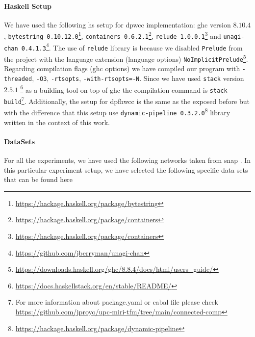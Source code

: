 \paragraph{Haskell Setup}
We have used the following \acrshort{hs} setup for \acrshort{dpwcc} implementation: \acrshort{ghc} version $8.10.4$, \texttt{bytestring 0.10.12.0}\footnote{\url{https://hackage.haskell.org/package/bytestring}}, \texttt{containers 0.6.2.1}\footnote{\url{https://hackage.haskell.org/package/containers}}, \texttt{relude 1.0.0.1}\footnote{\url{https://hackage.haskell.org/package/containers}} and \texttt{unagi-chan 0.4.1.3}\footnote{\url{https://github.com/jberryman/unagi-chan}}. 
The use of \texttt{relude} library is because we disabled \texttt{Prelude} from the project with the language extension (language options) \texttt{NoImplicitPrelude}\footnote{\url{https://downloads.haskell.org/ghc/8.8.4/docs/html/users_guide/}}. 
Regarding compilation flags (\acrshort{ghc} options) we have compiled our program with \texttt{-threaded}, \texttt{-O3}, \texttt{-rtsopts}, \texttt{-with-rtsopts=-N}. 
Since we have used \texttt{stack} version $2.5.1$ \footnote{\url{https://docs.haskellstack.org/en/stable/README/}} as a building tool on top of \acrshort{ghc} the compilation command is \texttt{stack build}\footnote{For more information about package.yaml or cabal file please check \url{https://github.com/jproyo/upc-miri-tfm/tree/main/connected-comp}}.
Additionally, the setup for \acrshort{dpfhwcc} is the same as the exposed before but with the difference that this setup use \texttt{dynamic-pipeline 0.3.2.0}\footnote{\url{https://hackage.haskell.org/package/dynamic-pipeline}} library written in the context of this work.


\paragraph{DataSets}\label{data:set}
For all the experiments, we have used the following networks taken from \acrshort{snap} \cite{stanford}. In this particular experiment setup, we have selected the following specific data sets that can be found here \cite{netastro, netenron, netwebgoogle}


